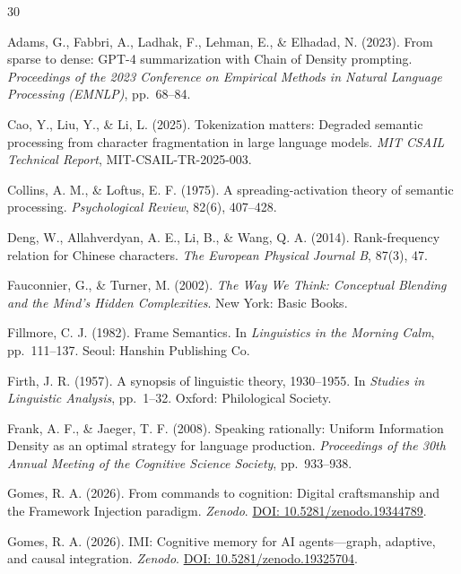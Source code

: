 \documentclass[12pt,a4paper]{article}
\begin{document}
\begin{thebibliography}{30}

Adams, G., Fabbri, A., Ladhak, F., Lehman, E., \& Elhadad, N. (2023).
From sparse to dense: GPT-4 summarization with Chain of Density prompting.
\textit{Proceedings of the 2023 Conference on Empirical Methods in Natural Language Processing (EMNLP)}, pp.\ 68--84.

Cao, Y., Liu, Y., \& Li, L. (2025).
Tokenization matters: Degraded semantic processing from character fragmentation in large language models.
\textit{MIT CSAIL Technical Report}, MIT-CSAIL-TR-2025-003.

Collins, A. M., \& Loftus, E. F. (1975).
A spreading-activation theory of semantic processing.
\textit{Psychological Review}, 82(6), 407--428.

Deng, W., Allahverdyan, A. E., Li, B., \& Wang, Q. A. (2014).
Rank-frequency relation for Chinese characters.
\textit{The European Physical Journal B}, 87(3), 47.

Fauconnier, G., \& Turner, M. (2002).
\textit{The Way We Think: Conceptual Blending and the Mind's Hidden Complexities}.
New York: Basic Books.

Fillmore, C. J. (1982).
Frame Semantics.
In \textit{Linguistics in the Morning Calm}, pp.\ 111--137.
Seoul: Hanshin Publishing Co.

Firth, J. R. (1957).
A synopsis of linguistic theory, 1930--1955.
In \textit{Studies in Linguistic Analysis}, pp.\ 1--32.
Oxford: Philological Society.

Frank, A. F., \& Jaeger, T. F. (2008).
Speaking rationally: Uniform Information Density as an optimal strategy for language production.
\textit{Proceedings of the 30th Annual Meeting of the Cognitive Science Society}, pp.\ 933--938.

Gomes, R. A. (2026).
From commands to cognition: Digital craftsmanship and the Framework Injection paradigm.
\textit{Zenodo}. \href{https://doi.org/10.5281/zenodo.19344789}{DOI: 10.5281/zenodo.19344789}.

Gomes, R. A. (2026).
IMI: Cognitive memory for AI agents---graph, adaptive, and causal integration.
\textit{Zenodo}. \href{https://doi.org/10.5281/zenodo.19325704}{DOI: 10.5281/zenodo.19325704}.


\end{thebibliography}
\end{document}
